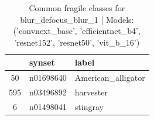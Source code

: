 \begin{table}
\caption{Common fragile classes for blur_defocus_blur_1 | Models: ('convnext_base', 'efficientnet_b4', 'resnet152', 'resnet50', 'vit_b_16')}
\label{tab:blur_defocus_blur_1_f8fe704f}
\begin{tabular}{cll}
\toprule
 & synset & label \\
\midrule
50 & n01698640 & American_alligator \\
595 & n03496892 & harvester \\
6 & n01498041 & stingray \\
\bottomrule
\end{tabular}
\end{table}
